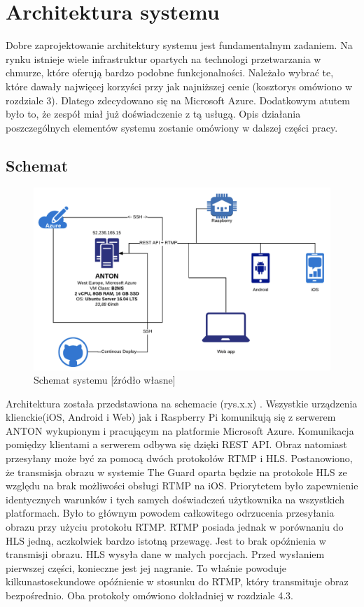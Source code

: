 \chapter{Architektura systemu}

Dobre zaprojektowanie architektury systemu jest fundamentalnym zadaniem. Na rynku istnieje wiele infrastruktur opartych na technologi przetwarzania w chmurze, które oferują bardzo podobne funkcjonalności. Należało wybrać te, które dawały najwięcej korzyści przy jak najniższej cenie (kosztorys omówiono w rozdziale 3). Dlatego zdecydowano się na Microsoft Azure. Dodatkowym atutem było to, że zespół miał już doświadczenie z tą usługą. Opis działania poszczególnych elementów systemu zostanie omówiony w dalszej części pracy.

\section{Schemat}

\begin{figure}[ht] %
   \centering
   \includegraphics[width=12cm]{anton.png} 
   \caption{Schemat systemu [źródło własne]}
\end{figure}

Architektura została przedstawiona na schemacie (rys.x.x) . Wszystkie urządzenia klienckie(iOS, Android i Web) jak i Raspberry Pi komunikują się z serwerem ANTON wykupionym i pracującym na platformie Microsoft Azure. Komunikacja pomiędzy klientami a serwerem odbywa się dzięki REST API. Obraz natomiast przesyłany może być za pomocą dwóch protokołów RTMP i HLS. Postanowiono, że transmisja obrazu w systemie The Guard oparta będzie na protokole HLS ze względu na brak możliwości obsługi RTMP na iOS. Priorytetem było zapewnienie identycznych warunków i tych samych doświadczeń użytkownika na wszystkich platformach. Było to głównym powodem całkowitego odrzucenia przesyłania obrazu przy użyciu protokołu RTMP. RTMP posiada jednak w porównaniu do HLS jedną, aczkolwiek bardzo istotną przewagę. Jest to brak opóźnienia w transmisji obrazu. HLS wysyła dane w małych porcjach. Przed wysłaniem pierwszej części, konieczne jest jej nagranie. To właśnie powoduje kilkunastosekundowe opóźnienie w stosunku do RTMP, który transmituje obraz bezpośrednio. Oba protokoły omówiono dokładniej w rozdziale 4.3.

